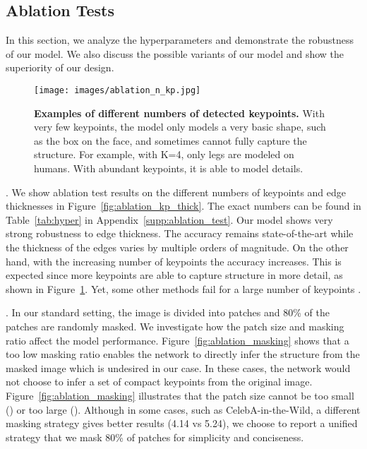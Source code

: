 \documentclass{article}
\begin{document}
\subsection{Ablation Tests} \label{sec:ablation}



In this section, we analyze the hyperparameters and demonstrate the robustness of our model. We also discuss the possible variants of our model and show the superiority of our design. 

\begin{figure}[t]
\begin{center}
  \texttt{[image: images/ablation\_n\_kp.jpg]}
\end{center}
   \caption{\textbf{Examples of different numbers of detected keypoints.} With very few keypoints, the model only models a very basic shape, such as the box on the face, and sometimes cannot fully capture the structure. For example, with K=4, only legs are modeled on humans. With abundant keypoints, it is able to model details.}
\label{fig:ablation_kp}
\end{figure}



. 
We show ablation test results on the different numbers of keypoints and edge thicknesses in Figure~\ref{fig:ablation_kp_thick}. The exact numbers can be found in Table~\ref{tab:hyper} in Appendix~\ref{supp:ablation_test}. Our model shows very strong robustness to edge thickness. The accuracy remains state-of-the-art while the thickness of the edges varies by multiple orders of magnitude.
On the other hand, with the increasing number of keypoints the accuracy increases. This is expected since more keypoints are able to capture structure in more detail, as shown in Figure~\ref{fig:ablation_kp}. Yet, some other methods fail for a large number of keypoints \cite{he2022ganseg}.

. 
In our standard setting, the image is divided into  patches and 80\% of the patches are randomly masked. We investigate how the patch size and masking ratio affect the model performance. Figure~\ref{fig:ablation_masking} shows that a too low masking ratio enables the network to directly infer the structure from the masked image which is undesired in our case.
In these cases, the network would not choose to infer a set of compact keypoints from the original image. Figure~\ref{fig:ablation_masking} illustrates that the patch size cannot be too small () or too large (). Although in some cases, such as CelebA-in-the-Wild, a different masking strategy gives better results (4.14 vs 5.24), we choose to report a unified strategy that we mask 80\% of  patches for simplicity and conciseness.
\end{document}
